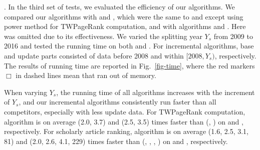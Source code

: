 


.
In the third set of tests, we evaluated the efficiency of our algorithms.
%
We compared our algorithms with \powtwprscc and \powensemble, which were the same to \twprscc and \batensemble except using power method for TWPageRank computation, and with algorithms \futurerank and \hhgrank.
Here \pagerank was omitted due to its effectiveness.
%
We varied the splitting year $Y_s$ from 2009 to 2016 and tested the running time on both \aminer and \magdata.
%
For incremental algorithms, base and update parts consisted of data before 2008 and within $[2008, Y_s)$, respectively.
%
The results of running time are reported in Fig.~\ref{fig-time}, where the red markers $\Box$ in dashed lines mean that \hhgrank ran out of memory.

When varying $Y_s$, the running time of all algorithms increases with the increment of $Y_s$, and our incremental algorithms
consistently run faster than all competitors, especially with less update data.
%
For TWPageRank computation, algorithm \inctwprscc is on average (2.0, 3.7) and (2.5, 3.5) times faster than (\twprscc, \powtwprscc) on \aminer and \magdata, respectively.
%
For scholarly article ranking, algorithm \incensemble is on average (1.6, 2.5, 3.1, 81) and (2.0, 2.6, 4.1, 229) times faster than (\batensemble, \powensemble, \futurerank, \hhgrank) on \aminer and \magdata, respectively.

